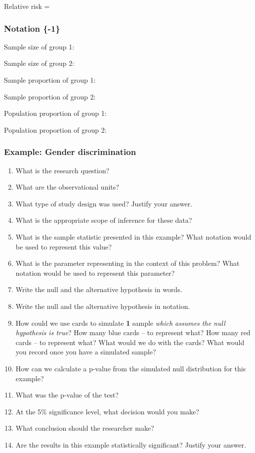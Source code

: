 \documentclass[
]{report}
\newcommand{\rgs}{\vspace{12pt}} %
\begin{document}
Relative risk =
\rgs

\hypertarget{notation--1}{%
\subsubsection{Notation \{-1\}}\label{notation--1}}

Sample size of group 1:
\rgs

Sample size of group 2:
\rgs

Sample proportion of group 1:
\rgs

Sample proportion of group 2:
\rgs

Population proportion of group 1:
\rgs

Population proportion of group 2:
\rgs

\hypertarget{example-gender-discrimination}{%
\subsubsection*{Example: Gender discrimination}\label{example-gender-discrimination}}

\begin{enumerate}
\def\labelenumi{\arabic{enumi}.}
\item
  What is the research question?
  \rgs
\item
  What are the observational units?
  \rgs
\item
  What type of study design was used? Justify your answer.
  \rgs
\item
  What is the appropriate scope of inference for these data?
  \rgs
\item
  What is the sample statistic presented in this example? What notation would be used to represent this value?
  \rgs
\item
  What is the parameter representing in the context of this problem? What notation would be used to represent this parameter?
  \rgs
  \rgs
\item
  Write the null and the alternative hypothesis in words.
  \rgs
  \rgs
\item
  Write the null and the alternative hypothesis in notation.
  \rgs
\item
  How could we use cards to simulate \textbf{1} sample \emph{which assumes the null hypothesis is true}? How many blue cards -- to represent what? How many red cards -- to represent what? What would we do with the cards? What would you record once you have a simulated sample?
  \rgs
  \rgs
\item
  How can we calculate a p-value from the simulated null distribution for this example?
  \rgs
  \rgs
\item
  What was the p-value of the test?
  \rgs
\item
  At the 5\% significance level, what decision would you make?
  \rgs
\item
  What conclusion should the researcher make?
  \rgs
  \rgs
\item
  Are the results in this example statistically significant? Justify your answer.
  \rgs
\end{enumerate}
\end{document}
